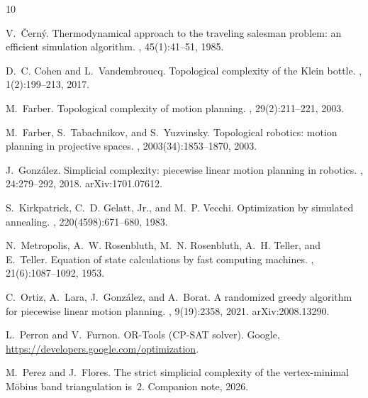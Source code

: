 \documentclass[12pt]{article}
\begin{document}
\begin{thebibliography}{10}

V.~\v{C}ern\'y.
\newblock Thermodynamical approach to the traveling salesman problem:
  an efficient simulation algorithm.
, 45(1):41--51, 1985.

D.~C. Cohen and L.~Vandembroucq.
\newblock Topological complexity of the Klein bottle.
, 1(2):199--213, 2017.

M.~Farber.
\newblock Topological complexity of motion planning.
, 29(2):211--221, 2003.

M.~Farber, S.~Tabachnikov, and S.~Yuzvinsky.
\newblock Topological robotics: motion planning in projective spaces.
, 2003(34):1853--1870, 2003.

J.~Gonz\'alez.
\newblock Simplicial complexity: piecewise linear motion planning in
  robotics.
, 24:279--292, 2018.
\newblock arXiv:1701.07612.

S.~Kirkpatrick, C.~D. Gelatt, Jr., and M.~P. Vecchi.
\newblock Optimization by simulated annealing.
, 220(4598):671--680, 1983.

N.~Metropolis, A.~W. Rosenbluth, M.~N. Rosenbluth, A.~H. Teller, and
  E.~Teller.
\newblock Equation of state calculations by fast computing machines.
, 21(6):1087--1092, 1953.

C.~Ortiz, A.~Lara, J.~Gonz\'alez, and A.~Borat.
\newblock A randomized greedy algorithm for piecewise linear motion
  planning.
, 9(19):2358, 2021.
\newblock arXiv:2008.13290.

L.~Perron and V.~Furnon.
\newblock OR-Tools (CP-SAT solver).
\newblock Google, \url{https://developers.google.com/optimization}.

M.~Perez and J.~Flores.
\newblock The strict simplicial complexity of the vertex-minimal
  M\"obius band triangulation is~$2$.
\newblock Companion note, 2026.

\end{thebibliography}
\end{document}
